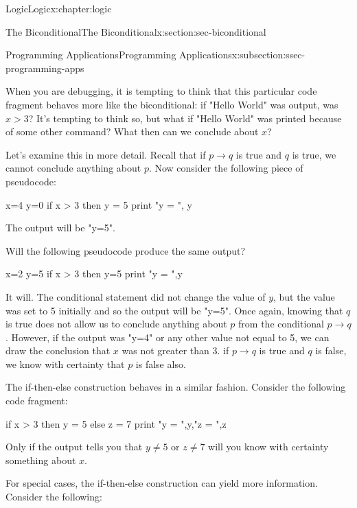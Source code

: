 \documentclass[twoside,10pt,]{book}
\numberwithin{equation}{section}
\newcommand{\conditional}{{p {\rightarrow} q}}
\newcommand{\gt}{>}
\begin{document}
\begin{chapterptx}{Logic}{}{Logic}{}{}{x:chapter:logic}
\begin{sectionptx}{The Biconditional}{}{The Biconditional}{}{}{x:section:sec-biconditional}
\begin{subsectionptx}{Programming Applications}{}{Programming Applications}{}{}{x:subsection:ssec-programming-apps}
\begin{codedisplay}
\end{codedisplay}
%
\par
When you are debugging, it is tempting to think that this particular code fragment behaves more like the biconditional: if "Hello World" was output, was \(x\gt 3\)?  It's tempting to think so, but what if "Hello World" was printed because of some other command?  What then can we conclude about \(x\)?%
\par
Let's examine this in more detail.  Recall that if \(\conditional\) is true and \(q\) is true, we cannot conclude anything about \(p\).  Now consider the following piece of pseudocode:%
\begin{codedisplay}

              x=4
              y=0
              if x > 3 then y = 5
              print "y = ", y
            
\end{codedisplay}
The output will be "y=5".%
\par
Will the following pseudocode produce the same output?%
\begin{codedisplay}

              x=2
              y=5
              if x > 3 then y=5
              print "y = ",y
            
\end{codedisplay}
It will.  The conditional statement did not change the value of \(y\), but the value was set to 5 initially and so the output will be "y=5".  Once again, knowing that \(q\) is true does not allow us to conclude anything about \(p\) from the conditional \(\conditional\).  However, if the output was "y=4" or any other value not equal to 5, we can draw the conclusion that \(x\) was not greater than 3.  if \(\conditional\) is true and \(q\) is false, we know with certainty that \(p\) is false also.%
\par
The if-then-else construction behaves in a similar fashion.  Consider the following code fragment:%
\begin{codedisplay}

              if x > 3 then
                y = 5
              else
                z = 7
              print "y = ",y,"z = ",z
            
\end{codedisplay}
Only if the output tells you that \(y\neq 5\) or \(z\neq 7\) will you know with certainty something about \(x\).%
\par
For special cases, the if-then-else construction can yield more information.  Consider the following:%
\begin{codedisplay}


\end{codedisplay}
\end{subsectionptx}
\end{sectionptx}
\end{chapterptx}
\end{document}
